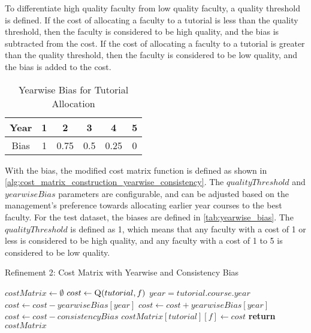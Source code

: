 To differentiate high quality faculty from low quality faculty, a quality threshold is defined. If the cost of allocating a faculty to a tutorial is less than the quality threshold, then the faculty is considered to be high quality, and the bias is subtracted from the cost. If the cost of allocating a faculty to a tutorial is greater than the quality threshold, then the faculty is considered to be low quality, and the bias is added to the cost.

\begin{table}[H]
  \centering
  \begin{tabular}{|c|c|c|c|c|c|}
    \hline
    Year & 1 & 2    & 3   & 4    & 5 \\ \hline
    Bias & 1 & 0.75 & 0.5 & 0.25 & 0 \\ \hline
  \end{tabular}
  \caption{Yearwise Bias for Tutorial Allocation}
  \label{tab:yearwise_bias}
\end{table}

With the bias, the modified cost matrix function is defined as shown in \autoref{alg:cost_matrix_construction_yearwise_consistency}. The $qualityThreshold$ and $yearwiseBias$ parameters are configurable, and can be adjusted based on the management's preference towards allocating earlier year courses to the best faculty. For the test dataset, the biases are defined in \autoref{tab:yearwise_bias}. The $qualityThreshold$ is defined as 1, which means that any faculty with a cost of 1 or less is considered to be high quality, and any faculty with a cost of 1 to 5 is considered to be low quality.


\begin{algorithm}[H]
  \caption*{Refinement 2: Cost Matrix with Yearwise and Consistency Bias}
  \begin{algorithmic}
    \State $costMatrix \gets \emptyset$
    \State $cost \gets \Call{Q}{tutorial, f}$
    \State $year = tutorial.course.year$
    \State $cost \gets cost - yearwiseBias[year]$
    \Else
    \State $cost \gets cost + yearwiseBias[year]$
    \EndIf
    \State $cost \gets cost - consistencyBias$
    \State $costMatrix[tutorial][f] \gets cost$
    \EndIf
    \EndFor
    \EndFor
    \State \textbf{return} $costMatrix$
    \EndProcedure
  \end{algorithmic}
\end{algorithm}

